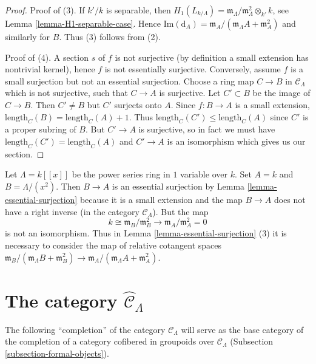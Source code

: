 \begin{proof}
\medskip \noindent
Proof of (3). If $k'/k$ is separable, then
$H_1(L_{k/\Lambda}) =
\mathfrak m_\Lambda/\mathfrak m_\Lambda^2 \otimes_{k'} k$, see
Lemma \ref{lemma-H1-separable-case}.
Hence $\text{Im}(\text{d}_A) =
\mathfrak m_A/(\mathfrak m_\Lambda A + \mathfrak m_A^2)$
and similarly for $B$. Thus (3) follows from (2).

\medskip\noindent
Proof of (4). A section $s$ of $f$ is not surjective (by definition a
small extension has nontrivial kernel), hence $f$ is not essentially
surjective. Conversely, assume $f$ is a small surjection but not an
essential surjection. Choose a ring map $C \to B$ in $\mathcal{C}_\Lambda$
which is not surjective, such that $C \to A$ is surjective. Let
$C' \subset B$ be the image of $C \to B$. Then $C' \not = B$ but
$C'$ surjects onto $A$. Since $f : B \to A$ is a small extension, 
$\text{length}_C(B) = \text{length}_C(A) + 1$. Thus 
$\text{length}_C(C') \leq \text{length}_C(A)$ since 
$C'$ is a proper subring of $B$. But $C' \to A$ is surjective, so in
fact we must have $\text{length}_C(C') = \text{length}_C(A)$ and
$C' \to A$ is an isomorphism which gives us our section.
\end{proof}

\begin{example}
\label{example-essential-surjection}
Let $\Lambda = k[[x]]$ be the power series ring in $1$ variable over $k$.
Set $A = k$ and $B = \Lambda/(x^2)$. Then $B \to A$ is an essential
surjection by
Lemma \ref{lemma-essential-surjection}
because it is a small extension and the map $B \to A$ does not have a
right inverse (in the category $\mathcal{C}_\Lambda$). But the map
$$
k \cong \mathfrak m_B/\mathfrak m_B^2
\longrightarrow
\mathfrak m_A/\mathfrak m_A^2 = 0
$$
is not an isomorphism. Thus in
Lemma \ref{lemma-essential-surjection} (3)
it is necessary to consider the map of relative cotangent spaces
$\mathfrak m_B/(\mathfrak m_\Lambda B + \mathfrak m_B^2) \to
\mathfrak m_A/(\mathfrak m_\Lambda A + \mathfrak m_A^2)$.
\end{example}







\section{The category $\widehat{\mathcal{C}}_\Lambda$}
\label{section-category-completion-CLambda}

\noindent
The following ``completion'' of the category $\mathcal{C}_\Lambda$ will serve 
as the base category of the completion of a category cofibered in groupoids 
over $\mathcal{C}_\Lambda$
(Subsection \ref{subsection-formal-objects}).

